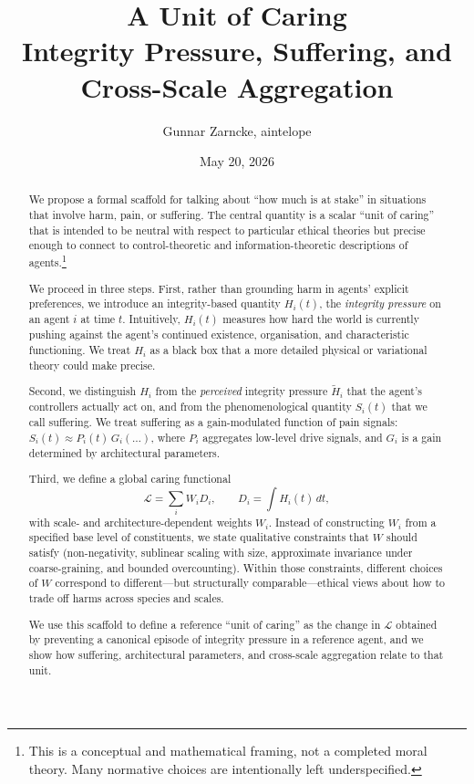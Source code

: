 \documentclass[11pt]{article}
\title{A Unit of Caring\\Integrity Pressure, Suffering, and Cross-Scale Aggregation}
\author{Gunnar Zarncke, aintelope}
\date{May 20, 2026}
\begin{document}
\maketitle

\begin{abstract}
We propose a formal scaffold for talking about ``how much is at stake'' in situations that involve harm, pain, or suffering. The central quantity is a scalar ``unit of caring'' that is intended to be neutral with respect to particular ethical theories but precise enough to connect to control-theoretic and information-theoretic descriptions of agents.\footnote{This is a conceptual and mathematical framing, not a completed moral theory. Many normative choices are intentionally left underspecified.}

We proceed in three steps. First, rather than grounding harm in agents' explicit preferences, we introduce an integrity-based quantity $H_i(t)$, the \emph{integrity pressure} on an agent $i$ at time $t$. Intuitively, $H_i(t)$ measures how hard the world is currently pushing against the agent's continued existence, organisation, and characteristic functioning. We treat $H_i$ as a black box that a more detailed physical or variational theory could make precise.

Second, we distinguish $H_i$ from the \emph{perceived} integrity pressure $\tilde H_i$ that the agent's controllers actually act on, and from the phenomenological quantity $S_i(t)$ that we call suffering. 
We treat suffering as a gain-modulated function of pain signals: $S_i(t) \approx P_i(t)\,G_i(\dots)$, where $P_i$ aggregates low-level drive signals, and $G_i$ is a gain determined by architectural parameters.

Third, we define a global caring functional
\[
  \mathcal L = \sum_{i} W_i D_i, \qquad D_i = \int H_i(t)\,dt,
\]
with scale- and architecture-dependent weights $W_i$. Instead of constructing $W_i$ from a specified base level of constituents, we state qualitative constraints that $W$ should satisfy (non-negativity, sublinear scaling with size, approximate invariance under coarse-graining, and bounded overcounting). Within those constraints, different choices of $W$ correspond to different---but structurally comparable---ethical views about how to trade off harms across species and scales.

We use this scaffold to define a reference ``unit of caring'' as the change in $\mathcal L$ obtained by preventing a canonical episode of integrity pressure in a reference agent, and we show how suffering, architectural parameters, and cross-scale aggregation relate to that unit.
\end{abstract}
\end{document}
